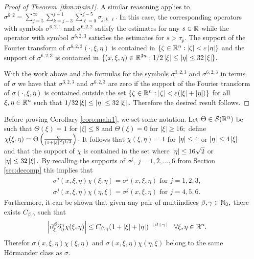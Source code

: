 \begin{proof}[Proof of Theorem~\ref{thm:main1}]
A similar reasoning applies to $\sigma^{6,2}=\sum_{j=5}^\infty\sum_{k=j-3}^{j-1}\sum_{\ell=0}^{j-5}\sigma_{j,k,\ell}.$ In this case, the corresponding operators with symbols $\sigma^{6,2,1}$ and $\sigma^{6,2,2}$ satisfy the estimates for any $s\in \mathbb{R}$ while the operator with symbol $\sigma^{6,2,3}$ satisfies the estimates for $s>\tau_p.$ The support of the Fourier transform of  $\sigma^{6,2,3}(\cdot,\xi,\eta)$ is contained in  $\{\zeta\in{{\mathbb R}^n}: \left\vert \zeta \right\vert< \varepsilon\left\vert \eta \right\vert\}$ and the support of $\sigma^{6,2,3}$ is contained   in  $\{(x,\xi,\eta)\in\mathbb{R}^{3n}: 1/2\left\vert \xi \right\vert\le\left\vert \eta \right\vert\le 32\left\vert \xi \right\vert\}.$

With the work above and the formulas for the symbols $\sigma^{3,2,3}$ and $\sigma^{6,2,3}$ in terms of $\sigma$ we have that $\sigma^{3,2,3}$ and $\sigma^{6,2,3}$ are zero if  the support of the Fourier transform of $\sigma(\cdot,\xi,\eta)$ is contained outside the set 
$\{\zeta\in{{\mathbb R}^n}:\left\vert \zeta \right\vert<\varepsilon (\left\vert \xi \right\vert+\left\vert \eta \right\vert)\}$ for all  $\xi,\eta\in{{\mathbb R}^n}$ such that $1/32\left\vert \xi \right\vert\le \left\vert \eta \right\vert\le 32 \left\vert \xi \right\vert.$ Therefore the desired result follows.
\end{proof}


Before proving Corollary \ref{coro:main1}, we set some notation. Let  $\Theta\in {\mathcal{S}}({{\mathbb R}^n})$ be such that $\Theta(\xi)=1$ for $|\xi|\le 8$ and $\Theta(\xi)=0$ for $|\xi|\ge 16;$ define $\chi(\xi,\eta)=\Theta\left(\frac{\eta}{(1+\left\vert \xi \right\vert^2)^{1/2}}\right).$ It follows that $\chi(\xi,\eta)=1$ for $\left\vert \eta \right\vert\le 4$ or $\left\vert \eta \right\vert\le 4\left\vert \xi \right\vert$ and that the support of  $\chi$ is contained in the set where $ \left\vert \eta \right\vert\le 16 \sqrt{2}$ or $\left\vert \eta \right\vert\le 32\left\vert \xi \right\vert.$ By recalling the supports of $\sigma^j$, $j = 1,2,\dots,6$ from Section \ref{sec:decomp} this implies  that 
 \begin{align*}
 \sigma^{j}(x,\xi,\eta)\chi(\xi,\eta)=\sigma^{j}(x,\xi,\eta) \text{ for } j=1,2, 3,\\
  \sigma^{j}(x,\xi,\eta)\chi(\eta,\xi)=\sigma^{j}(x,\xi,\eta)\text{ for } j=4, 5,6.
 \end{align*}
 Furthermore, it can be shown that given any pair of multiindices $\beta,\gamma\in \mathbb{N}_0,$ there exists $C_{\beta,\gamma}$ such that
 \begin{equation*}
 \left\vert \partial_\xi^\beta\partial_\eta^\gamma\chi(\xi,\eta) \right\vert\le C_{\beta,\gamma} (1+\left\vert \xi \right\vert+\left\vert \eta \right\vert)^{-\left\vert \beta+\gamma \right\vert}\quad \forall \xi,\eta\in {{\mathbb R}^n}.
 \end{equation*}
 Therefor $\sigma(x,\xi,\eta)\chi(\xi,\eta)$ and $\sigma(x,\xi,\eta)\chi(\eta,\xi)$ belong to the same H\"ormander class as $\sigma.$




